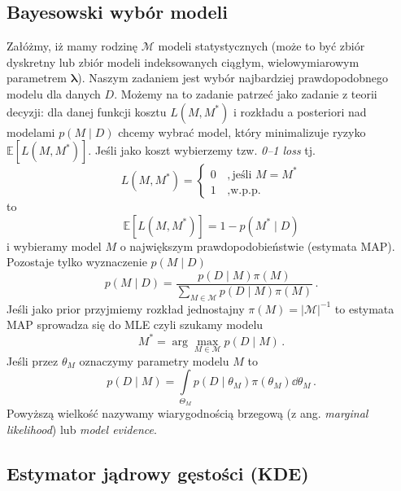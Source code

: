 \documentclass{myclass}
\begin{document}
\subsection{Bayesowski wybór modeli}

Załóżmy, iż mamy rodzinę \(\mathcal{M}\) modeli statystycznych (może to być zbiór dyskretny lub
zbiór modeli indeksowanych ciągłym, wielowymiarowym parametrem \(\boldsymbol{\lambda}\)). Naszym
zadaniem jest wybór najbardziej prawdopodobnego modelu dla danych \(D\). Możemy na to zadanie
patrzeć jako zadanie z teorii decyzji: dla danej funkcji kosztu \(L(M, M^*)\) i rozkładu a
posteriori nad modelami \(p(M \mid D)\) chcemy wybrać model, który minimalizuje ryzyko
\(\mathbb{E}[L(M,M^*)]\). Jeśli jako koszt wybierzemy tzw. \textit{0--1 loss} tj.
\begin{equation*}
    L(M, M^*) = \begin{cases}
        0&\,, \text{jeśli \(M = M^*\)} \\
        1&\,, \text{w.p.p.}
    \end{cases}
\end{equation*}
to
\begin{equation*}
    \mathbb{E}[L(M, M^*)] = 1 - p(M^* \mid D)
\end{equation*}
i wybieramy model \(M\) o największym prawdopodobieństwie (estymata MAP). Pozostaje tylko
wyznaczenie \(p(M \mid D)\)
\begin{equation*}
    p(M \mid D) = \frac{p(D \mid M)\pi(M)}{\sum_{M\in\mathcal{M}} p(D \mid M)\pi(M)}\,.
\end{equation*}
Jeśli jako prior przyjmiemy rozkład jednostajny \(\pi(M) = |\mathcal{M}|^{-1}\) to estymata MAP
sprowadza się do MLE czyli szukamy modelu
\begin{equation*}
    M^* = \arg\max_{M\in\mathcal{M}} p(D \mid M)\,.
\end{equation*}
Jeśli przez \(\theta_M\) oznaczymy parametry modelu \(M\) to 
\begin{equation*}
    p(D \mid M) = \int\limits_{\Theta_M} p(D \mid \theta_M) \pi(\theta_M) \dd{\theta}_M\,.
\end{equation*}
Powyższą wielkość nazywamy wiarygodnością brzegową (z ang. \textit{marginal likelihood}) lub
\textit{model evidence}.

\subsection{Estymator jądrowy gęstości (KDE)}
\end{document}
